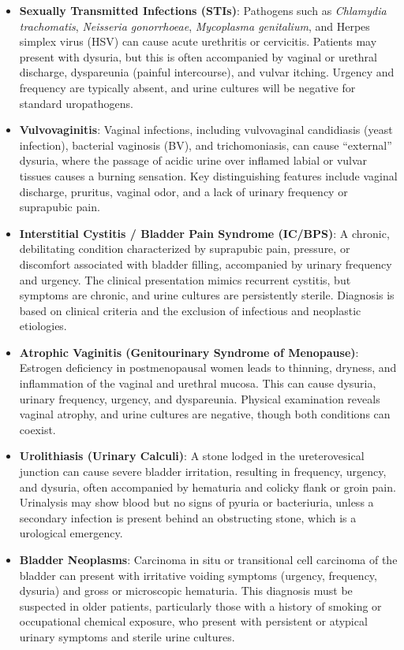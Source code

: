 \begin{itemize}
    \item \textbf{Sexually Transmitted Infections (STIs)}: Pathogens such as \textit{Chlamydia trachomatis}, \textit{Neisseria gonorrhoeae}, \textit{Mycoplasma genitalium}, and Herpes simplex virus (HSV) can cause acute urethritis or cervicitis. Patients may present with dysuria, but this is often accompanied by vaginal or urethral discharge, dyspareunia (painful intercourse), and vulvar itching. Urgency and frequency are typically absent, and urine cultures will be negative for standard uropathogens.
    \item \textbf{Vulvovaginitis}: Vaginal infections, including vulvovaginal candidiasis (yeast infection), bacterial vaginosis (BV), and trichomoniasis, can cause ``external'' dysuria, where the passage of acidic urine over inflamed labial or vulvar tissues causes a burning sensation. Key distinguishing features include vaginal discharge, pruritus, vaginal odor, and a lack of urinary frequency or suprapubic pain.
    \item \textbf{Interstitial Cystitis / Bladder Pain Syndrome (IC/BPS)}: A chronic, debilitating condition characterized by suprapubic pain, pressure, or discomfort associated with bladder filling, accompanied by urinary frequency and urgency. The clinical presentation mimics recurrent cystitis, but symptoms are chronic, and urine cultures are persistently sterile. Diagnosis is based on clinical criteria and the exclusion of infectious and neoplastic etiologies.
    \item \textbf{Atrophic Vaginitis (Genitourinary Syndrome of Menopause)}: Estrogen deficiency in postmenopausal women leads to thinning, dryness, and inflammation of the vaginal and urethral mucosa. This can cause dysuria, urinary frequency, urgency, and dyspareunia. Physical examination reveals vaginal atrophy, and urine cultures are negative, though both conditions can coexist.
    \item \textbf{Urolithiasis (Urinary Calculi)}: A stone lodged in the ureterovesical junction can cause severe bladder irritation, resulting in frequency, urgency, and dysuria, often accompanied by hematuria and colicky flank or groin pain. Urinalysis may show blood but no signs of pyuria or bacteriuria, unless a secondary infection is present behind an obstructing stone, which is a urological emergency.
    \item \textbf{Bladder Neoplasms}: Carcinoma in situ or transitional cell carcinoma of the bladder can present with irritative voiding symptoms (urgency, frequency, dysuria) and gross or microscopic hematuria. This diagnosis must be suspected in older patients, particularly those with a history of smoking or occupational chemical exposure, who present with persistent or atypical urinary symptoms and sterile urine cultures.

\end{itemize}
